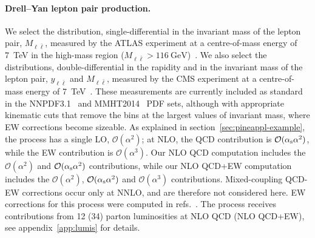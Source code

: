 \paragraph{Drell--Yan lepton pair production.}
We select the distribution, single-differential in the invariant mass of the
lepton pair, $M_{\ell \bar\ell}$, measured by the ATLAS experiment at a centre-of-mass
energy of \SI{7}{\tera\electronvolt} in the high-mass region
($M_{\ell\bar\ell}>\SI{116}{\giga\electronvolt}$)~\cite{Aad:2013iua}.
We also select the distributions, double-differential in the rapidity and in
the invariant mass of the lepton pair, $y_{\ell\bar\ell}$ and $M_{\ell\bar\ell}$,
measured by the CMS experiment at a centre-of-mass energy of
\SI{7}{\tera\electronvolt}~\cite{Chatrchyan:2013tia}.
These measurements are currently included as standard in the
NNPDF3.1~\cite{Ball:2017nwa} and MMHT2014~\cite{Harland-Lang:2014zoa} PDF sets,
although with appropriate kinematic cuts that remove the bins at the largest
values of invariant mass, where EW corrections become sizeable. As explained in
section~\ref{sec:pineappl-example}, 
the process has a single LO, $\mathcal{O}(\alpha^2)$; at NLO, the
QCD contribution is $\mathcal{O}(\alpha_\mathrm{s}\alpha^2)$, while the EW contribution
is $\mathcal{O}(\alpha^3)$. Our NLO QCD computation includes the
$\mathcal{O}(\alpha^2)$ and $\mathcal{O}(\alpha_\mathrm{s}\alpha^2)$ contributions, while
our NLO QCD+EW computation includes the $\mathcal{O}(\alpha^2)$, 
$\mathcal{O}(\alpha_\mathrm{s}\alpha^2)$ and $\mathcal{O}(\alpha^3)$ contributions.
Mixed-coupling QCD-EW corrections occur only at NNLO, and are therefore not
considered here. EW corrections for this process were computed in
refs.~\cite{Baur:2001ze,Dittmaier:2009cr}. The process receives contributions
from 12 (34) parton luminosities at NLO QCD (NLO QCD+EW),
see appendix~\ref{app:lumis} for details.

